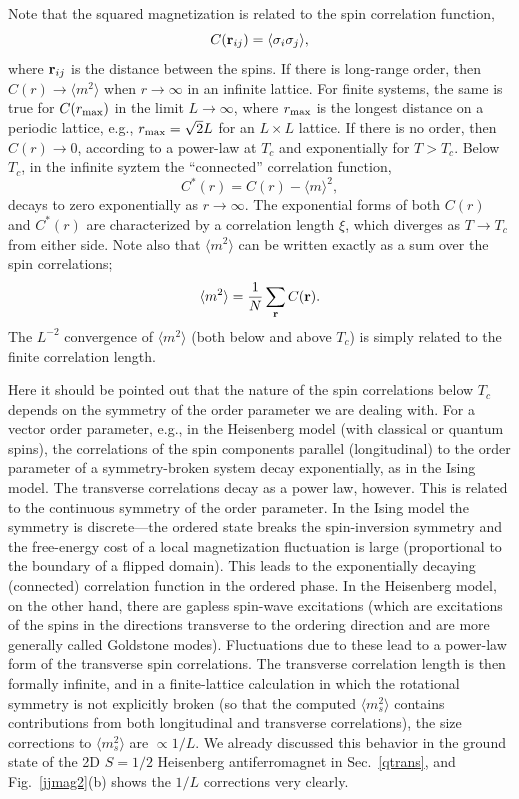 \documentclass[draft,numberedheadings]{aipproc}
\begin{document}
Note that the squared magnetization is related to the spin correlation function,
\begin{equation}
C({\bf r}_{ij})=\langle \sigma_i\sigma_j\rangle,
\end{equation}
where ${\bf r}_{ij}$ is the distance between the spins. If there is long-range order, then $C(r) \to \langle m^2\rangle$ when $r\to \infty$ in an
infinite lattice. For finite systems, the same is true for $C(r_{\rm max})$ in the limit $L\to \infty$, where $r_{\rm max}$ is the longest distance on a 
periodic lattice, e.g., $r_{\rm max} = \sqrt{2}L$ for an $L\times L$ lattice. If there is no order, then $C(r) \to 0$, according to a power-law at $T_c$ 
and exponentially for $T>T_c$. Below $T_c$, in the infinite syztem the ``connected'' correlation function,
\begin{equation}
C^*(r) = C(r)-\langle m\rangle^2,
\label{connectedcorr}
\end{equation}
decays to zero exponentially 
as $r \to \infty$. The exponential forms of both $C(r)$ and $C^*(r)$ are characterized by a correlation length $\xi$, which diverges as $T\to T_c$ 
from either side. Note also that $\langle m^2\rangle$ can be written exactly as a sum over the spin correlations;
\begin{equation}
\langle m^2\rangle =\frac{1}{N}\sum_{\bf r} C({\bf r}).
\end{equation}
The $L^{-2}$ convergence of $\langle m^2\rangle$ (both below and above $T_c$) is simply related to the finite correlation length.

Here it should be pointed out that the nature of the spin correlations below $T_c$ depends on the symmetry of the order parameter we are dealing with. 
For a vector order parameter, e.g., in the Heisenberg model (with classical or quantum spins), the correlations of the spin components parallel 
(longitudinal) to the order parameter of a symmetry-broken system decay exponentially, as in the Ising model. The transverse correlations decay as 
a power law, however. This is related to the continuous symmetry of the order parameter. In the Ising model the symmetry is discrete---the ordered state 
breaks the spin-inversion symmetry and the free-energy cost of a local magnetization fluctuation is large (proportional to the boundary of a flipped 
domain). This leads to the exponentially decaying (connected) correlation function in the ordered phase. In the Heisenberg model, on the other hand, there
are gapless spin-wave excitations (which are excitations of the spins in the directions transverse to the ordering direction and are more generally called 
Goldstone modes). Fluctuations due to these lead to a power-law form of the transverse spin correlations. The transverse correlation length is then formally 
infinite, and in a finite-lattice calculation in which the rotational symmetry is not explicitly broken (so that the computed $\langle m^2_s\rangle$ contains 
contributions from both longitudinal and transverse correlations), the size corrections to $\langle m^2_s\rangle$ are $\propto 1/L$. We already discussed 
this behavior in the ground state of the 2D $S=1/2$ Heisenberg antiferromagnet in Sec.~\ref{qtrans}, and Fig.~\ref{jjmag2}(b) shows the $1/L$ corrections 
very clearly.
\end{document}
